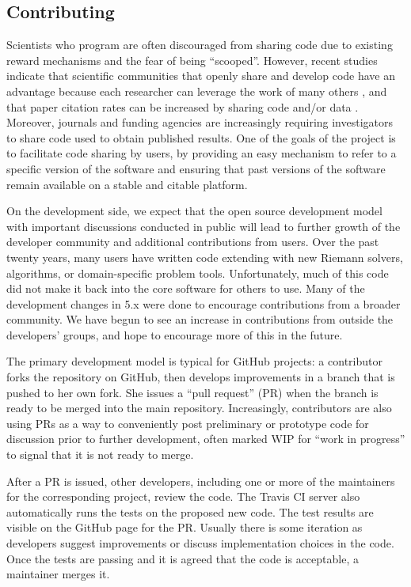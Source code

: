 \subsection{Contributing}

Scientists who program are often discouraged from sharing code
due to existing reward mechanisms and the fear of being ``scooped''.
However, recent studies indicate that
scientific communities that openly share and develop code
have an advantage because each researcher can leverage the work of
many others \cite{Turk:2013hd}, and that paper citation rates can be
increased by sharing code \cite{Vandewalle2012} and/or
data \cite{PiwowarDayEtAl2007}.
Moreover, journals and funding agencies are increasingly requiring
investigators to share code used to obtain published results.  One
of the goals of the \clawpack project is to facilitate code sharing
by users, by providing an easy mechanism to refer to a specific
version of the \clawpack software and ensuring that past versions
of the software remain available on a stable and citable platform.

On the development side, we expect that the open source development model
with important discussions conducted in public will lead to further growth of
the developer community and additional contributions from users.
Over the past twenty years, many users have written
code extending \clawpack with new Riemann solvers, algorithms, or
domain-specific problem tools.  Unfortunately, much of this code did not
make it back into the core software for others to use.
Many of the development changes in \clawpack 5.x were done
to encourage contributions from a broader community. We have begun to see an
increase in contributions from outside the developers' groups, and hope to
encourage more of this in the future.


The primary development model is typical for GitHub projects: a
contributor forks the repository on GitHub, then develops improvements
in a branch that is pushed to her own fork.  She issues a ``pull
request'' (PR) when the branch is ready to be merged into the main
repository.  Increasingly, contributors are also using PRs as a way to
conveniently post preliminary or prototype code for discussion prior
to further development, often marked WIP for ``work in progress'' to signal
that it is not ready to merge.

After a PR is issued, other developers, including one or more of the
maintainers for the corresponding project, review the code.  The Travis
CI server also automatically runs the tests on the proposed new code.  The test
results are visible on the GitHub page for the PR.  Usually there is
some iteration as developers suggest improvements or discuss
implementation choices in the code.  Once the tests are passing and it
is agreed that the code is acceptable, a maintainer merges it.


